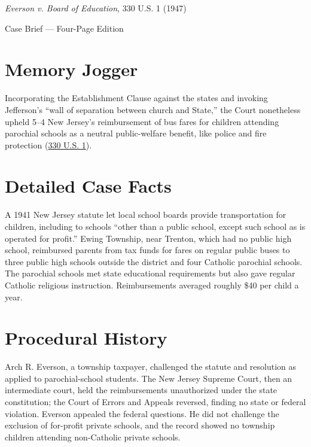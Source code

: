 \documentclass[12pt]{article}
\begin{document}
\begin{center}
{\LARGE \textit{Everson v. Board of Education}, 330 U.S. 1 (1947)\par}
\vspace{0.8em}
{\large Case Brief --- Four-Page Edition\par}
\end{center}
\vspace{1em}

\section{Memory Jogger}

Incorporating the Establishment Clause against the states and invoking Jefferson's ``wall of separation between church and State,'' the Court nonetheless upheld 5--4 New Jersey's reimbursement of bus fares for children attending parochial schools as a neutral public-welfare benefit, like police and fire protection (\href{https://supreme.justia.com/cases/federal/us/330/1/}{330 U.S. 1}).

\section{Detailed Case Facts}

A 1941 New Jersey statute let local school boards provide transportation for children, including to schools ``other than a public school, except such school as is operated for profit.'' Ewing Township, near Trenton, which had no public high school, reimbursed parents from tax funds for fares on regular public buses to three public high schools outside the district and four Catholic parochial schools. The parochial schools met state educational requirements but also gave regular Catholic religious instruction. Reimbursements averaged roughly \$40 per child a year.

\section{Procedural History}

Arch R. Everson, a township taxpayer, challenged the statute and resolution as applied to parochial-school students. The New Jersey Supreme Court, then an intermediate court, held the reimbursements unauthorized under the state constitution; the Court of Errors and Appeals reversed, finding no state or federal violation. Everson appealed the federal questions. He did not challenge the exclusion of for-profit private schools, and the record showed no township children attending non-Catholic private schools.
\end{document}
